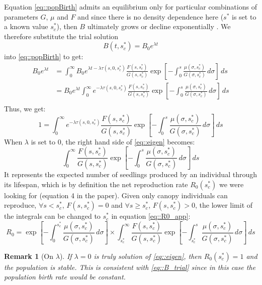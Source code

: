 \documentclass[letterpaper, 12pt]{article}
\newcommand {\s}{{s}^{*}}
\theoremstyle{theo}
\newtheorem{rem}{Remark}[section]
\begin{document}
\begin{refsection}
\begin{onehalfspace}
Equation \eqref{eq::popBirth} admits an equilibrium only for particular combinations of parameters $ G $, $ \mu $ and $ F $ and since there is no density dependence here ($ \s $ is set to a known value $ \s_c $), then $ B $ ultimately grows or decline exponentially \citep{DeRoos1997}. We therefore substitute the trial solution
\begin{equation} \label{eq::B_trial}
	B(t, \s_c) = B_0e^{\lambda t}
\end{equation}
into \eqref{eq::popBirth} to get:
\begin{align*}
	B_0 e^{\lambda t} &= \int_{0}^{\infty} B_0 e^{\lambda t - \lambda \tau(s, 0, \s_c)} \frac{F(s, \s_c)}{G(s, \s_c)} \exp \left[ -\int_{0}^{s} \frac{\mu(\sigma, \s_c)}{G(\sigma, \s_c)} \, d\sigma \right] \, ds \\
	&= B_0 e^{\lambda t} \int_{0}^{\infty} e^{- \lambda \tau(s, 0, \s_c)} \frac{F(s, \s_c)}{G(s, \s_c)} \exp \left[ -\int_{0}^{s} \frac{\mu(\sigma, \s_c)}{G(\sigma, \s_c)} \, d\sigma \right] \, ds \\
\end{align*}
Thus, we get:
\begin{equation} \label{eq::eigen}
	1 = \int_{0}^{\infty} e^{- \lambda \tau(s, 0, \s_c)} \frac{F(s, \s_c)}{G(s, \s_c)} \exp \left[ -\int_{0}^{s} \frac{\mu(\sigma, \s_c)}{G(\sigma, \s_c)} \, d\sigma \right] \, ds
\end{equation}
When $ \lambda $ is set to 0, the right hand side of \eqref{eq::eigen} becomes:
\begin{equation} \label{eq::R0_app}
	\int_{0}^{\infty} \frac{F(s, \s_c)}{G(s, \s_c)} \exp \left[ -\int_{0}^{s} \frac{\mu(\sigma, \s_c)}{G(\sigma, \s_c)} \, d\sigma \right] \, ds
\end{equation}
It represents the expected number of seedlings produced by an individual through its lifespan, which is by definition the net reproduction rate $ R_0(\s_c) $ we were looking for (equation 4 in the paper). Given only canopy individuals can reproduce, $ \forall s < \s_c $, $ F(s, \s_c) = 0 $ and $ \forall s \geqslant \s_c $, $ F(s, \s_c) > 0 $, the lower limit of the integrals can be changed to $ \s_c $ in equation \eqref{eq::R0_app}:
\[
	R_0 = \exp \left[- \int_{0}^{\s_c} \frac{\mu(\sigma, \s_c)}{G(\sigma, \s_c)} \, d\sigma \right] \times \int_{\s_c}^{\infty} \frac{F(s, \s_c)}{G(s, \s_c)} \exp \left[ - \int_{\s_c}^{s} \frac{\mu(\sigma, \s_c)}{G(\sigma, \s_c)} \, d\sigma \right] \, ds
\]
\begin{rem}[On $ \lambda $]
	If $ \lambda = 0 $ is truly solution of \eqref{eq::eigen}, then $ R_0(\s_c) = 1 $ and the population is stable. This is consistent with \eqref{eq::B_trial} since in this case the population birth rate would be constant.
\end{rem}


\end{onehalfspace}
\end{refsection}
\end{document}
